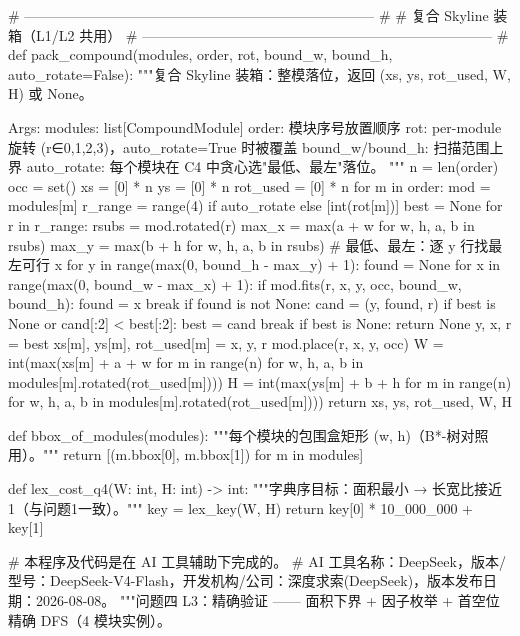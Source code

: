 \documentclass{JXUSTmodeling}
\begin{document}
\begin{appendixx}
\begin{python}
# --------------------------------------------------------------------------- #
# 复合 Skyline 装箱（L1/L2 共用）
# --------------------------------------------------------------------------- #
def pack_compound(modules, order, rot, bound_w, bound_h, auto_rotate=False):
    """复合 Skyline 装箱：整模落位，返回 (xs, ys, rot_used, W, H) 或 None。

    Args:
        modules: list[CompoundModule]
        order:   模块序号放置顺序
        rot:     per-module 旋转 (r∈{0,1,2,3})，auto_rotate=True 时被覆盖
        bound_w/bound_h: 扫描范围上界
        auto_rotate: 每个模块在 C4 中贪心选"最低、最左"落位。
    """
    n = len(order)
    occ = set()
    xs = [0] * n
    ys = [0] * n
    rot_used = [0] * n
    for m in order:
        mod = modules[m]
        r_range = range(4) if auto_rotate else [int(rot[m])]
        best = None
        for r in r_range:
            rsubs = mod.rotated(r)
            max_x = max(a + w for w, h, a, b in rsubs)
            max_y = max(b + h for w, h, a, b in rsubs)
            # 最低、最左：逐 y 行找最左可行 x
            for y in range(max(0, bound_h - max_y) + 1):
                found = None
                for x in range(max(0, bound_w - max_x) + 1):
                    if mod.fits(r, x, y, occ, bound_w, bound_h):
                        found = x
                        break
                if found is not None:
                    cand = (y, found, r)
                    if best is None or cand[:2] < best[:2]:
                        best = cand
                    break
        if best is None:
            return None
        y, x, r = best
        xs[m], ys[m], rot_used[m] = x, y, r
        mod.place(r, x, y, occ)
    W = int(max(xs[m] + a + w for m in range(n)
                for w, h, a, b in modules[m].rotated(rot_used[m])))
    H = int(max(ys[m] + b + h for m in range(n)
                for w, h, a, b in modules[m].rotated(rot_used[m])))
    return xs, ys, rot_used, W, H


def bbox_of_modules(modules):
    """每个模块的包围盒矩形 (w, h)（B*-树对照用）。"""
    return [(m.bbox[0], m.bbox[1]) for m in modules]


def lex_cost_q4(W: int, H: int) -> int:
    """字典序目标：面积最小 → 长宽比接近 1（与问题1一致）。"""
    key = lex_key(W, H)
    return key[0] * 10_000_000 + key[1]
  \end{python}
  \begin{python}
# 本程序及代码是在 AI 工具辅助下完成的。
# AI 工具名称：DeepSeek，版本/型号：DeepSeek-V4-Flash，开发机构/公司：深度求索(DeepSeek)，版本发布日期：2026-08-08。
"""问题四 L3：精确验证 —— 面积下界 + 因子枚举 + 首空位精确 DFS（4 模块实例）。


\end{python}
\end{appendixx}
\end{document}
